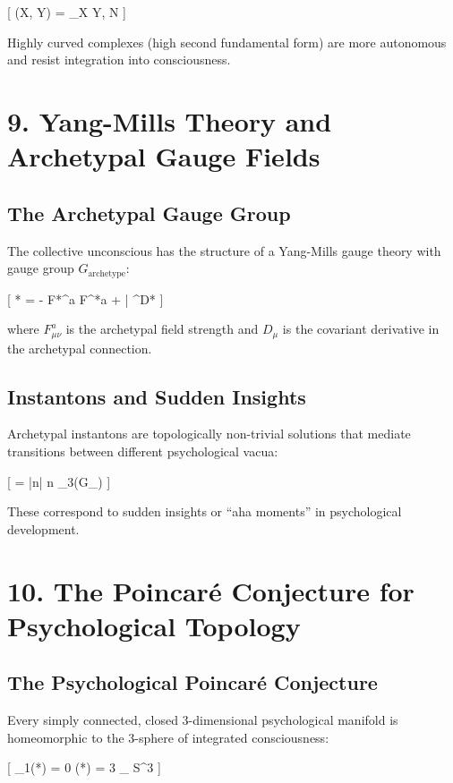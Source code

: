 \documentclass[12pt]{article}
\begin{document}
[
(X, Y) = \langle \nabla_X Y, N \rangle
]

Highly curved complexes (high second fundamental form) are more autonomous and resist integration into consciousness.

\section*{9. Yang-Mills Theory and Archetypal Gauge Fields}

\subsection*{The Archetypal Gauge Group}

The collective unconscious has the structure of a Yang-Mills gauge theory with gauge group $G_{\text{archetype}}$:

[
*{} = - F*{\mu\nu}^a F^{\mu\nu}*a + \bar{\psi} \gamma^\mu D*\mu \psi
]

where $F_{\mu\nu}^a$ is the archetypal field strength and $D_\mu$ is the covariant derivative in the archetypal connection.

\subsection*{Instantons and Sudden Insights}

Archetypal instantons are topologically non-trivial solutions that mediate transitions between different psychological vacua:

[
 =  |n| \quad {} n \in \pi_3(G_{})
]

These correspond to sudden insights or “aha moments” in psychological development.

\section*{10. The Poincaré Conjecture for Psychological Topology}

\subsection*{The Psychological Poincaré Conjecture}

Every simply connected, closed 3-dimensional psychological manifold is homeomorphic to the 3-sphere of integrated consciousness:

[
\pi_1(*{}) = 0  \dim(*{}) = 3 \Rightarrow {}_{} \cong S^3
]
\end{document}

